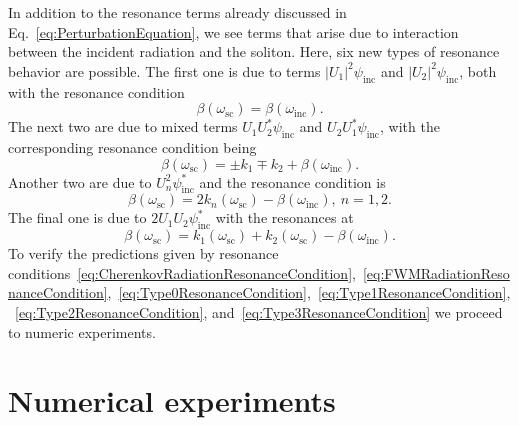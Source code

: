 \documentclass[aps, pra, twocolumn, superscriptaddress, final]{revtex4}
\newcommand{\abs}[1]{\left| #1 \right|}
\begin{document}
In addition to the resonance terms already discussed in
Eq.~\eqref{eq:PerturbationEquation}, we see terms that arise due to
interaction between the incident radiation and the soliton. Here, six new
types of resonance behavior are possible. The first one is due to terms
$\abs{U_{1}}^{2} \psi_{\text{inc}}$ and $\abs{U_{2}}^{2} \psi_{\text{inc}}$,
both with the resonance condition
\begin{equation}
  \label{eq:Type0ResonanceCondition}
  \beta(\omega_{\text{sc}}) = \beta(\omega_{\text{inc}}).
\end{equation}
The next two are due to mixed terms $U_{1} U_{2}^{*} \psi_{\text{inc}}$ and $U_{2} U_{1}^{*} \psi_{\text{inc}}$, with the corresponding resonance condition being
\begin{equation}
  \label{eq:Type1ResonanceCondition}
  \beta(\omega_{\text{sc}}) = \pm k_{1} \mp k_{2} + \beta(\omega_{\text{inc}}).
\end{equation}
Another two are due to $U_{n}^{2} \psi_{\text{inc}}^{*}$ and the resonance condition is
\begin{equation}
  \label{eq:Type2ResonanceCondition}
  \beta(\omega_{\text{sc}}) =
    2 k_{n}(\omega_{\text{sc}}) -
    \beta(\omega_{\text{inc}}), ~ n = 1, 2.
\end{equation}
The final one is due to $2 U_{1} U_{2} \psi_{\text{inc}}^{*}$ with the resonances at
\begin{equation}
  \label{eq:Type3ResonanceCondition}
  \beta(\omega_{\text{sc}}) =
    k_{1}(\omega_{\text{sc}}) +
    k_{2}(\omega_{\text{sc}}) -
    \beta(\omega_{\text{inc}}).
\end{equation}
To verify the predictions given by resonance
conditions~\eqref{eq:CherenkovRadiationResonanceCondition},~\eqref{eq:FWMRadiationResonanceCondition},~\eqref{eq:Type0ResonanceCondition},~\eqref{eq:Type1ResonanceCondition},~\eqref{eq:Type2ResonanceCondition},
and~\eqref{eq:Type3ResonanceCondition} we proceed to numeric experiments.

\section{Numerical experiments\label{sec:num_exp}}%
\end{document}
